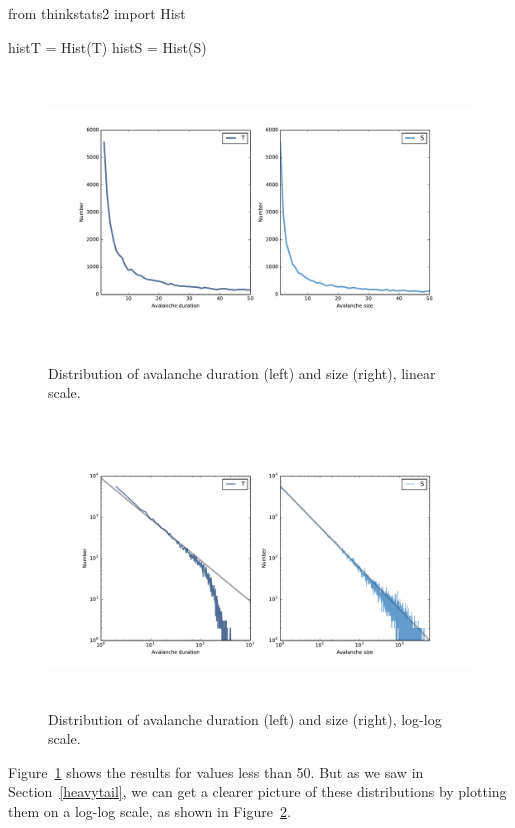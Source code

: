 \documentclass[12pt]{book}
\theoremstyle{exercise}
\begin{document}
\begin{code}
from thinkstats2 import Hist

histT = Hist(T)
histS = Hist(S)
\end{code}

\begin{figure}
\centerline{\includegraphics[height=3in]{figs/chap08-2.pdf}}
\caption{Distribution of avalanche duration (left) and size (right), linear scale.}
\label{chap08-2}
\end{figure}

\begin{figure}
\centerline{\includegraphics[height=3in]{figs/chap08-3.pdf}}
\caption{Distribution of avalanche duration (left) and size (right), log-log scale.}
\label{chap08-3}
\end{figure}

Figure~\ref{chap08-2} shows the results for values less than 50.
But as we saw in Section~\ref{heavytail}, we can get a clearer picture of
these distributions by plotting them on a log-log scale, as shown
in Figure~\ref{chap08-3}.
\end{document}
